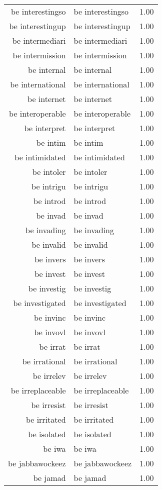 \begin{table}[ht]
\begin{tabular}{rlr}
  be interestingso & be interestingso & 1.00 \\ 
  be interestingup & be interestingup & 1.00 \\ 
  be intermediari & be intermediari & 1.00 \\ 
  be intermission & be intermission & 1.00 \\ 
  be internal & be internal & 1.00 \\ 
  be international & be international & 1.00 \\ 
  be internet & be internet & 1.00 \\ 
  be interoperable & be interoperable & 1.00 \\ 
  be interpret & be interpret & 1.00 \\ 
  be intim & be intim & 1.00 \\ 
  be intimidated & be intimidated & 1.00 \\ 
  be intoler & be intoler & 1.00 \\ 
  be intrigu & be intrigu & 1.00 \\ 
  be introd & be introd & 1.00 \\ 
  be invad & be invad & 1.00 \\ 
  be invading & be invading & 1.00 \\ 
  be invalid & be invalid & 1.00 \\ 
  be invers & be invers & 1.00 \\ 
  be invest & be invest & 1.00 \\ 
  be investig & be investig & 1.00 \\ 
  be investigated & be investigated & 1.00 \\ 
  be invinc & be invinc & 1.00 \\ 
  be invovl & be invovl & 1.00 \\ 
  be irrat & be irrat & 1.00 \\ 
  be irrational & be irrational & 1.00 \\ 
  be irrelev & be irrelev & 1.00 \\ 
  be irreplaceable & be irreplaceable & 1.00 \\ 
  be irresist & be irresist & 1.00 \\ 
  be irritated & be irritated & 1.00 \\ 
  be isolated & be isolated & 1.00 \\ 
  be iwa & be iwa & 1.00 \\ 
  be jabbawockeez & be jabbawockeez & 1.00 \\ 
  be jamad & be jamad & 1.00 \\ 

\end{tabular}
\end{table}
